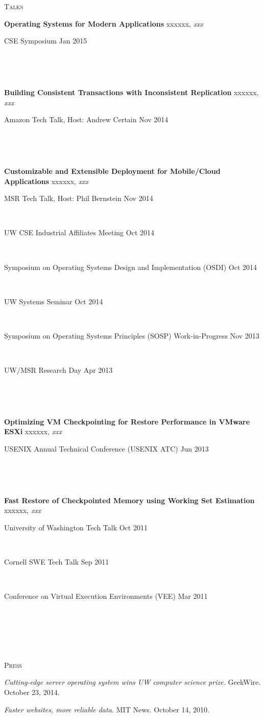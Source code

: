 \documentclass[10pt,times]{report}
\newlength{\sectiongap}
\newlength{\entrygap}
\newlength{\sectioncolwidth}
\newlength{\colgap}
\newlength{\stuffwidth}
\def\ifEqString#1#2{\def\testa{#1}\def\testb{#2}%
  \ifx\testa\testb}
\newenvironment{rtable}{
  \begin{minipage}{\textwidth}
  }{
  \end{minipage}
}
\newenvironment{rentry}[3][xxx]{
  \begin{minipage}[t]{\hsize}
    \textbf{#2}\ifEqString{#1}{xxx}\relax\else, \textit{#1}\fi
    \hspace{\stretch{1}} #3 \\
  }{
    \removelastskip
  \end{minipage}
  \\[\entrygap]  %
}
\newcommand{\rline}[2]{
  \begin{minipage}[t]{\hsize}
    #1 \hspace{\stretch{1}} #2
  \end{minipage} \\
}
\newenvironment{rsection}[1]{
  \begin{minipage}[t]{\sectioncolwidth}
    \textsc{#1}
  \end{minipage}
  \hspace{\colgap}
  \begin{minipage}[t]{\stuffwidth}
  }{
    \removelastskip
  \end{minipage}
  \\[\sectiongap]
}
\begin{document}
\begin{rtable}
  \begin{rsection}{Talks}
    \begin{rentry}{Operating Systems for Modern Applications}{}
      \rline{CSE Symposium}{Jan 2015}
      \vspace{-0.5em}
    \end{rentry}
    \begin{rentry}{Building Consistent Transactions with Inconsistent
        Replication}{}
      \rline{Amazon Tech Talk, Host: Andrew Certain}{Nov 2014}
      \vspace{-0.5em}
    \end{rentry}
    \begin{rentry}{Customizable and Extensible Deployment for
        Mobile/Cloud Applications}{}
      \rline{MSR Tech Talk, Host: Phil Bernstein}{Nov 2014}
      \rline{UW CSE Industrial Affiliates Meeting}{Oct 2014}
      \rline{Symposium on Operating Systems Design and
        Implementation (OSDI)}{Oct 2014}
      \rline{UW Systems Seminar}{Oct 2014}
      \rline{Symposium on Operating Systems Principles (SOSP) Work-in-Progress}{Nov 2013}
      \rline{UW/MSR Research Day}{Apr 2013}
      \vspace{-0.5em}
    \end{rentry}
    \begin{rentry}{Optimizing VM Checkpointing for Restore Performance
      in VMware ESXi}{} 
      \rline{USENIX Annual Technical Conference (USENIX ATC)}{Jun
        2013}
      \vspace{-0.5em}
    \end{rentry}
    \begin{rentry}{Fast Restore of Checkpointed Memory using Working
        Set Estimation}{}
      \rline{University of Washington Tech Talk}{Oct 2011}
      \rline{Cornell SWE Tech Talk}{Sep 2011}
      \rline{Conference on Virtual Execution Environments (VEE)}{Mar
        2011}
      \vspace{-0.5em}
    \end{rentry}
  \end{rsection}

  \begin{rsection}{Press}
    \textit{Cutting-edge server operating system wins UW computer
      science prize.} GeekWire. October 23, 2014.\\\vspace{-0.5em}

    \textit{Faster websites, more reliable data.}
    MIT News. October 14, 2010.
  \end{rsection}
\end{rtable}
\end{document}
